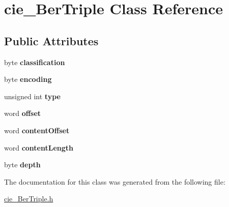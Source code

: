 \hypertarget{classcie__BerTriple}{}\section{cie\+\_\+\+Ber\+Triple Class Reference}
\label{classcie__BerTriple}
\subsection*{Public Attributes}
\begin{DoxyCompactItemize}
\item 
byte {\bfseries classification}\hypertarget{classcie__BerTriple_a6d4456082efedc29211638355b686cce}{}\label{classcie__BerTriple_a6d4456082efedc29211638355b686cce}

\item 
byte {\bfseries encoding}\hypertarget{classcie__BerTriple_a067c989ceb2407a2fc0bab9c1b14f2c3}{}\label{classcie__BerTriple_a067c989ceb2407a2fc0bab9c1b14f2c3}

\item 
unsigned int {\bfseries type}\hypertarget{classcie__BerTriple_a01b0ccac695aa38a70cbf3d8e745f7de}{}\label{classcie__BerTriple_a01b0ccac695aa38a70cbf3d8e745f7de}

\item 
word {\bfseries offset}\hypertarget{classcie__BerTriple_aa55a63c680ea48d63f9442fdaf0339c9}{}\label{classcie__BerTriple_aa55a63c680ea48d63f9442fdaf0339c9}

\item 
word {\bfseries content\+Offset}\hypertarget{classcie__BerTriple_a3a509d27802b92d0b3a2a075f4f61f45}{}\label{classcie__BerTriple_a3a509d27802b92d0b3a2a075f4f61f45}

\item 
word {\bfseries content\+Length}\hypertarget{classcie__BerTriple_a17509c2d5c3c5cdf57c268c5c89f5650}{}\label{classcie__BerTriple_a17509c2d5c3c5cdf57c268c5c89f5650}

\item 
byte {\bfseries depth}\hypertarget{classcie__BerTriple_a2d5a2e18f25c8c53232b186fae27ed58}{}\label{classcie__BerTriple_a2d5a2e18f25c8c53232b186fae27ed58}

\end{DoxyCompactItemize}


The documentation for this class was generated from the following file\+:\begin{DoxyCompactItemize}
\item 
\hyperlink{cie__BerTriple_8h}{cie\+\_\+\+Ber\+Triple.\+h}\end{DoxyCompactItemize}
